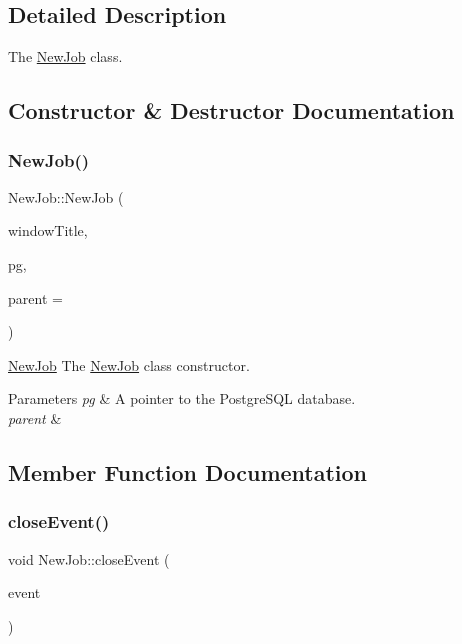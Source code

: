 \subsection{Detailed Description}
The \hyperlink{class_new_job}{New\+Job} class. 

\subsection{Constructor \& Destructor Documentation}
\mbox{\label{class_new_job_a489279a9ec91bcac74d7dad65eb2f85a}} 
\subsubsection{\texorpdfstring{New\+Job()}{NewJob()}}
{\footnotesize\ttfamily New\+Job\+::\+New\+Job (\begin{DoxyParamCaption}\item[{Q\+String}]{window\+Title,  }\item[{\hyperlink{classpsql}{psql} $\ast$}]{pg,  }\item[{Q\+Widget $\ast$}]{parent = {} }\end{DoxyParamCaption})\hspace{0.3cm}{\ttfamily [explicit]}}



\hyperlink{class_new_job}{New\+Job} The \hyperlink{class_new_job}{New\+Job} class constructor. 


\begin{DoxyParams}{Parameters}
{\em pg} & A pointer to the Postgre\+S\+QL database. \\
\hline
{\em parent} & \\
\hline
\end{DoxyParams}


\subsection{Member Function Documentation}
\mbox{\label{class_new_job_a84f6390f63ce01fb860b375f53f9c68d}} 
\subsubsection{\texorpdfstring{close\+Event()}{closeEvent()}}
{\footnotesize\ttfamily void New\+Job\+::close\+Event (\begin{DoxyParamCaption}\item[{Q\+Close\+Event $\ast$}]{event }\end{DoxyParamCaption})\hspace{0.3cm}{\ttfamily [override]}}



